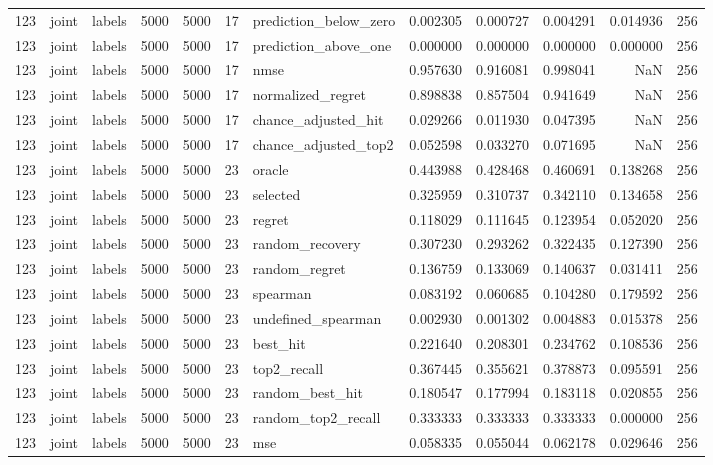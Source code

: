 \begin{tabular}{rllrrrlrrrrr}
123 & joint & labels & 5000 & 5000 & 17 & prediction_below_zero & 0.002305 & 0.000727 & 0.004291 & 0.014936 & 256 \\
123 & joint & labels & 5000 & 5000 & 17 & prediction_above_one & 0.000000 & 0.000000 & 0.000000 & 0.000000 & 256 \\
123 & joint & labels & 5000 & 5000 & 17 & nmse & 0.957630 & 0.916081 & 0.998041 & NaN & 256 \\
123 & joint & labels & 5000 & 5000 & 17 & normalized_regret & 0.898838 & 0.857504 & 0.941649 & NaN & 256 \\
123 & joint & labels & 5000 & 5000 & 17 & chance_adjusted_hit & 0.029266 & 0.011930 & 0.047395 & NaN & 256 \\
123 & joint & labels & 5000 & 5000 & 17 & chance_adjusted_top2 & 0.052598 & 0.033270 & 0.071695 & NaN & 256 \\
123 & joint & labels & 5000 & 5000 & 23 & oracle & 0.443988 & 0.428468 & 0.460691 & 0.138268 & 256 \\
123 & joint & labels & 5000 & 5000 & 23 & selected & 0.325959 & 0.310737 & 0.342110 & 0.134658 & 256 \\
123 & joint & labels & 5000 & 5000 & 23 & regret & 0.118029 & 0.111645 & 0.123954 & 0.052020 & 256 \\
123 & joint & labels & 5000 & 5000 & 23 & random_recovery & 0.307230 & 0.293262 & 0.322435 & 0.127390 & 256 \\
123 & joint & labels & 5000 & 5000 & 23 & random_regret & 0.136759 & 0.133069 & 0.140637 & 0.031411 & 256 \\
123 & joint & labels & 5000 & 5000 & 23 & spearman & 0.083192 & 0.060685 & 0.104280 & 0.179592 & 256 \\
123 & joint & labels & 5000 & 5000 & 23 & undefined_spearman & 0.002930 & 0.001302 & 0.004883 & 0.015378 & 256 \\
123 & joint & labels & 5000 & 5000 & 23 & best_hit & 0.221640 & 0.208301 & 0.234762 & 0.108536 & 256 \\
123 & joint & labels & 5000 & 5000 & 23 & top2_recall & 0.367445 & 0.355621 & 0.378873 & 0.095591 & 256 \\
123 & joint & labels & 5000 & 5000 & 23 & random_best_hit & 0.180547 & 0.177994 & 0.183118 & 0.020855 & 256 \\
123 & joint & labels & 5000 & 5000 & 23 & random_top2_recall & 0.333333 & 0.333333 & 0.333333 & 0.000000 & 256 \\
123 & joint & labels & 5000 & 5000 & 23 & mse & 0.058335 & 0.055044 & 0.062178 & 0.029646 & 256 \\

\end{tabular}
